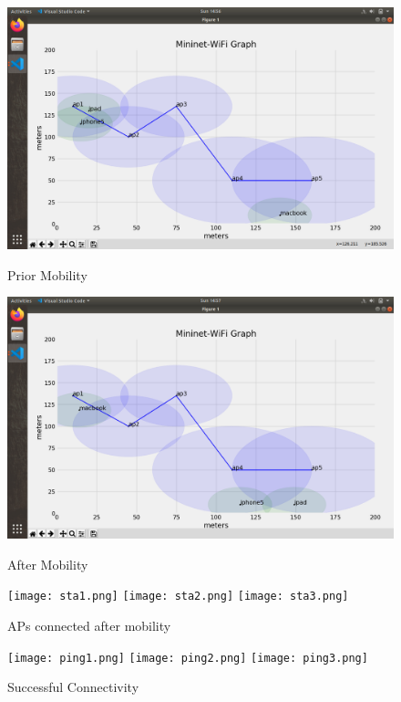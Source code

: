 \documentclass{article}
\begin{document}
    	\begin{figure}[h]
        			\includegraphics[width=0.9\linewidth]{beforeMobility.png}
        			\caption{Prior Mobility}
       			\label{fig:t1-3}
        		\endminipage
        			\includegraphics[width=0.9\linewidth]{afterMobility.png}
        			\caption{After Mobility}
        			\label{fig:t1-4}
        		\endminipage\vspace{10pt}
        			\texttt{[image: sta1.png]}
        			\texttt{[image: sta2.png]}
        			\texttt{[image: sta3.png]}
        			\caption{APs connected after mobility}
        			\label{fig:t1-5}
        		\endminipage\vspace{10pt}
        			\texttt{[image: ping1.png]}
        			\texttt{[image: ping2.png]}
       			\texttt{[image: ping3.png]}
        			\caption{Successful Connectivity}
        			\label{fig:t1-6}
        		\endminipage
    	\end{figure}

\newpage
\end{document}
